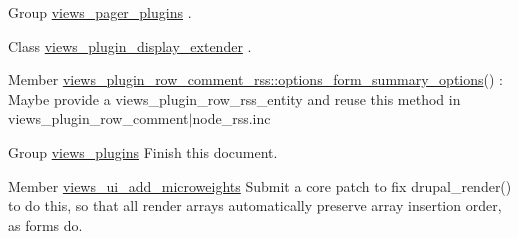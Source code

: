 \label{todo__todo000058}
\hypertarget{todo__todo000058}{}
 
\begin{DoxyDescription}
\item[Group \hyperlink{group__views__pager__plugins}{views\_\-pager\_\-plugins} ].


\end{DoxyDescription}

\label{todo__todo000056}
\hypertarget{todo__todo000056}{}
 
\begin{DoxyDescription}
\item[Class \hyperlink{classviews__plugin__display__extender}{views\_\-plugin\_\-display\_\-extender} ].


\end{DoxyDescription}

\label{todo__todo000053}
\hypertarget{todo__todo000053}{}
 
\begin{DoxyDescription}
\item[Member \hyperlink{classviews__plugin__row__comment__rss_a62f1381c8f5def6a790685208be61dae}{views\_\-plugin\_\-row\_\-comment\_\-rss::options\_\-form\_\-summary\_\-options}() ]: Maybe provide a views\_\-plugin\_\-row\_\-rss\_\-entity and reuse this method in views\_\-plugin\_\-row\_\-comment$|$node\_\-rss.inc 
\end{DoxyDescription}

\label{todo__todo000060}
\hypertarget{todo__todo000060}{}
 
\begin{DoxyDescription}
\item[Group \hyperlink{group__views__plugins}{views\_\-plugins} ]Finish this document.


\end{DoxyDescription}

\label{todo__todo000050}
\hypertarget{todo__todo000050}{}
 
\begin{DoxyDescription}
\item[Member \hyperlink{admin_8inc_a21c22d965161a3efb6b1f10570d3f9cd}{views\_\-ui\_\-add\_\-microweights} ]Submit a core patch to fix drupal\_\-render() to do this, so that all render arrays automatically preserve array insertion order, as forms do. 
\end{DoxyDescription}

\label{todo__todo000048}
\hypertarget{todo__todo000048}{}
 
